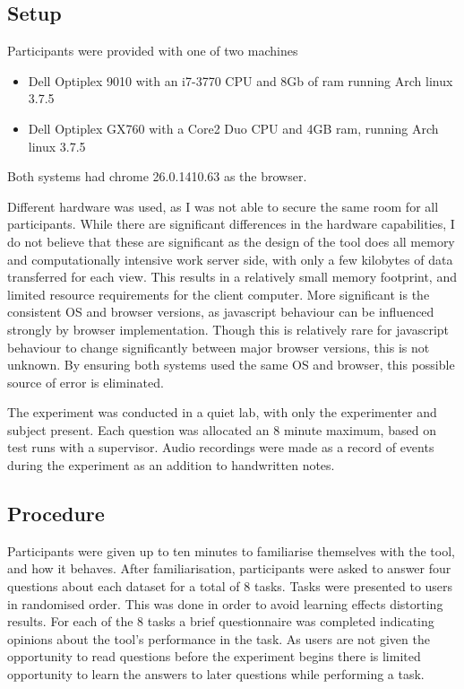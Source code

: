 \subsection{Setup}
Participants were provided with one of two machines
\begin{itemize}
\item{Dell Optiplex 9010 with an i7-3770 CPU and 8Gb of ram running Arch linux 3.7.5}
\item{Dell Optiplex GX760 with a Core2 Duo CPU and 4GB ram, running Arch linux 3.7.5}
\end{itemize}
Both systems had chrome 26.0.1410.63 as the browser.

Different hardware was used, as I was not able to secure the same room for all participants. 
While there are significant differences in the hardware capabilities, I do not believe that these are significant
as the design of the tool does all memory and computationally intensive work server side, with only a few kilobytes of data transferred for each view. This results in a relatively small memory footprint, and limited resource requirements for the client computer.
More significant is the consistent OS and browser versions, as javascript behaviour can be influenced strongly by browser implementation. Though this is relatively rare for javascript behaviour to change significantly between major browser versions, this is not unknown. By ensuring both systems used the same OS and browser, this possible source of error is eliminated.

The experiment was conducted in a quiet lab, with only the experimenter and subject present. Each question was allocated an 8 minute maximum, based on test runs with a supervisor. Audio recordings were made as a record of events during the experiment as an addition to handwritten notes. 

\subsection{Procedure}
Participants were given up to ten minutes to familiarise themselves with the tool, and how it behaves. After familiarisation, participants were asked to answer four questions about each  dataset for a total of 8 tasks. Tasks were presented to users in randomised order. This was done in order to avoid learning effects distorting results. For each of the 8 tasks a brief questionnaire was completed indicating opinions about the tool's performance in the task\cite{lewis1995ibm}. As users are not given the opportunity to read questions before the experiment begins there is limited opportunity to learn the answers to later questions while performing a task. 

